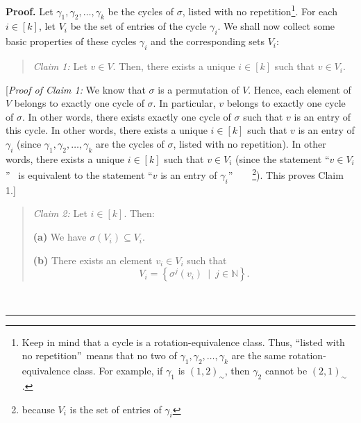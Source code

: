 \documentclass[numbers=enddot,12pt,final,onecolumn,notitlepage]{scrartcl}%
\numberwithin{exer}{section}
\theoremstyle{definition}
\newenvironment{statement}{\begin{quote}}{\end{quote}}
\newenvironment{proof}[1][Proof]{\noindent\textbf{#1.} }{\ \rule{0.5em}{0.5em}}
\newenvironment{verlong}{}{}
\begin{document}
\begin{verlong}


\begin{proof}
Let $\gamma_{1},\gamma_{2},\ldots,\gamma_{k}$ be the cycles of $\sigma$,
listed with no repetition\footnote{Keep in mind that a cycle is a
rotation-equivalence class. Thus, \textquotedblleft listed with no
repetition\textquotedblright\ means that no two of $\gamma_{1},\gamma
_{2},\ldots,\gamma_{k}$ are the same rotation-equivalence class. For example,
if $\gamma_{1}$ is $\left(  1,2\right)  _{\sim}$, then $\gamma_{2}$ cannot be
$\left(  2,1\right)  _{\sim}$.}. For each $i\in\left[  k\right]  $, let
$V_{i}$ be the set of entries of the cycle $\gamma_{i}$. We shall now collect
some basic properties of these cycles $\gamma_{i}$ and the corresponding sets
$V_{i}$:

\begin{statement}
\textit{Claim 1:} Let $v\in V$. Then, there exists a unique $i\in\left[
k\right]  $ such that $v\in V_{i}$.
\end{statement}

[\textit{Proof of Claim 1:} We know that $\sigma$ is a permutation of $V$.
Hence, each element of $V$ belongs to exactly one cycle of $\sigma$. In
particular, $v$ belongs to exactly one cycle of $\sigma$. In other words,
there exists exactly one cycle of $\sigma$ such that $v$ is an entry of this
cycle. In other words, there exists a unique $i\in\left[  k\right]  $ such
that $v$ is an entry of $\gamma_{i}$ (since $\gamma_{1},\gamma_{2}%
,\ldots,\gamma_{k}$ are the cycles of $\sigma$, listed with no repetition). In
other words, there exists a unique $i\in\left[  k\right]  $ such that $v\in
V_{i}$ (since the statement \textquotedblleft$v\in V_{i}$\textquotedblright%
\ is equivalent to the statement \textquotedblleft$v$ is an entry of
$\gamma_{i}$\textquotedblright\ \ \ \ \footnote{because $V_{i}$ is the set of
entries of $\gamma_{i}$}). This proves Claim 1.] \medskip

\begin{statement}
\textit{Claim 2:} Let $i\in\left[  k\right]  $. Then:

\textbf{(a)} We have $\sigma\left(  V_{i}\right)  \subseteq V_{i}$.

\textbf{(b)} There exists an element $v_{i}\in V_{i}$ such that%
\[
V_{i}=\left\{  \sigma^{j}\left(  v_{i}\right)  \ \mid\ j\in\mathbb{N}\right\}
.
\]

\end{statement}


\end{proof}
\end{verlong}
\end{document}
